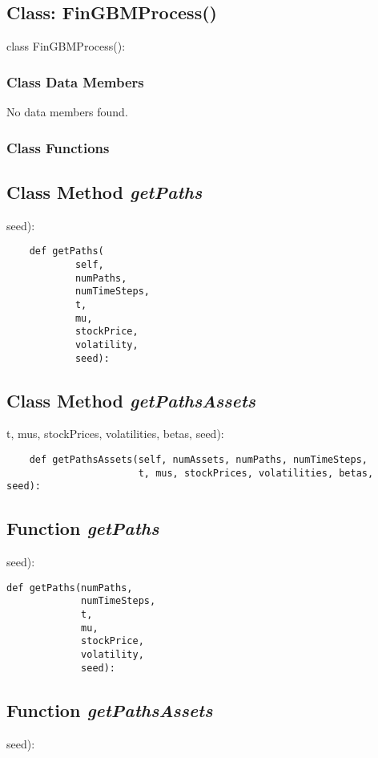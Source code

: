 \documentclass[twoside,11pt]{book}
\begin{document}
\subsection{Class: FinGBMProcess()}
class FinGBMProcess():

\subsubsection{Class Data Members}
No data members found.

\subsubsection{Class Functions}

\subsection{Class Method {\it getPaths}}
seed):

\begin{lstlisting}
    def getPaths(
            self,
            numPaths,
            numTimeSteps,
            t,
            mu,
            stockPrice,
            volatility,
            seed):
\end{lstlisting}

\subsection{Class Method {\it getPathsAssets}}
t, mus, stockPrices, volatilities, betas, seed):

\begin{lstlisting}
    def getPathsAssets(self, numAssets, numPaths, numTimeSteps,
                       t, mus, stockPrices, volatilities, betas, seed):
\end{lstlisting}

\subsection{Function {\it getPaths}}
seed):

\begin{lstlisting}
def getPaths(numPaths,
             numTimeSteps,
             t,
             mu,
             stockPrice,
             volatility,
             seed):
\end{lstlisting}

\subsection{Function {\it getPathsAssets}}
seed):
\end{document}
